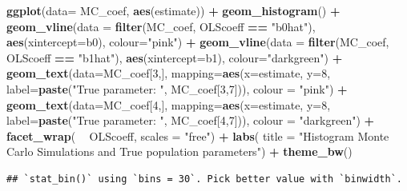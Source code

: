 \documentclass[]{book}
\newenvironment{Shaded}{\begin{snugshade}}{\end{snugshade}}
\newcommand{\DataTypeTok}[1]{\textcolor[rgb]{0.13,0.29,0.53}{#1}}
\newcommand{\DecValTok}[1]{\textcolor[rgb]{0.00,0.00,0.81}{#1}}
\newcommand{\KeywordTok}[1]{\textcolor[rgb]{0.13,0.29,0.53}{\textbf{#1}}}
\newcommand{\NormalTok}[1]{#1}
\newcommand{\OperatorTok}[1]{\textcolor[rgb]{0.81,0.36,0.00}{\textbf{#1}}}
\newcommand{\StringTok}[1]{\textcolor[rgb]{0.31,0.60,0.02}{#1}}
\begin{document}
\begin{Shaded}
\begin{Highlighting}[]
\KeywordTok{ggplot}\NormalTok{(}\DataTypeTok{data=}\NormalTok{ MC_coef, }\KeywordTok{aes}\NormalTok{(estimate)) }\OperatorTok{+}\StringTok{ }
\StringTok{  }\KeywordTok{geom_histogram}\NormalTok{() }\OperatorTok{+}\StringTok{ }
\StringTok{  }\KeywordTok{geom_vline}\NormalTok{(}\DataTypeTok{data =} \KeywordTok{filter}\NormalTok{(MC_coef, OLScoeff }\OperatorTok{==}\StringTok{ "b0hat"}\NormalTok{), }\KeywordTok{aes}\NormalTok{(}\DataTypeTok{xintercept=}\NormalTok{b0), }\DataTypeTok{colour=}\StringTok{"pink"}\NormalTok{) }\OperatorTok{+}
\StringTok{  }\KeywordTok{geom_vline}\NormalTok{(}\DataTypeTok{data =} \KeywordTok{filter}\NormalTok{(MC_coef, OLScoeff }\OperatorTok{==}\StringTok{ "b1hat"}\NormalTok{), }\KeywordTok{aes}\NormalTok{(}\DataTypeTok{xintercept=}\NormalTok{b1), }\DataTypeTok{colour=}\StringTok{"darkgreen"}\NormalTok{) }\OperatorTok{+}\StringTok{ }
\StringTok{  }\KeywordTok{geom_text}\NormalTok{(}\DataTypeTok{data=}\NormalTok{MC_coef[}\DecValTok{3}\NormalTok{,], }\DataTypeTok{mapping=}\KeywordTok{aes}\NormalTok{(}\DataTypeTok{x=}\NormalTok{estimate, }\DataTypeTok{y=}\DecValTok{8}\NormalTok{, }\DataTypeTok{label=}\KeywordTok{paste}\NormalTok{(}\StringTok{"True parameter: "}\NormalTok{, MC_coef[}\DecValTok{3}\NormalTok{,}\DecValTok{7}\NormalTok{])), }\DataTypeTok{colour =} \StringTok{"pink"}\NormalTok{) }\OperatorTok{+}
\StringTok{  }\KeywordTok{geom_text}\NormalTok{(}\DataTypeTok{data=}\NormalTok{MC_coef[}\DecValTok{4}\NormalTok{,], }\DataTypeTok{mapping=}\KeywordTok{aes}\NormalTok{(}\DataTypeTok{x=}\NormalTok{estimate, }\DataTypeTok{y=}\DecValTok{8}\NormalTok{, }\DataTypeTok{label=}\KeywordTok{paste}\NormalTok{(}\StringTok{"True parameter: "}\NormalTok{, MC_coef[}\DecValTok{4}\NormalTok{,}\DecValTok{7}\NormalTok{])), }\DataTypeTok{colour =} \StringTok{"darkgreen"}\NormalTok{) }\OperatorTok{+}
\StringTok{  }\KeywordTok{facet_wrap}\NormalTok{( }\OperatorTok{~}\StringTok{ }\NormalTok{OLScoeff, }\DataTypeTok{scales =} \StringTok{"free"}\NormalTok{)   }\OperatorTok{+}
\StringTok{  }\KeywordTok{labs}\NormalTok{(}
    \DataTypeTok{title =} \StringTok{"Histogram Monte Carlo Simulations and True population parameters"}\NormalTok{) }\OperatorTok{+}
\StringTok{  }\KeywordTok{theme_bw}\NormalTok{()}
\end{Highlighting}
\end{Shaded}

\begin{verbatim}
## `stat_bin()` using `bins = 30`. Pick better value with `binwidth`.
\end{verbatim}
\end{document}
